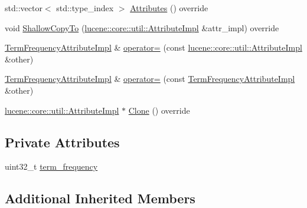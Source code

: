\begin{DoxyCompactItemize}
\item 
std\+::vector$<$ std\+::type\+\_\+index $>$ \mbox{\hyperlink{classlucene_1_1core_1_1analysis_1_1tokenattributes_1_1TermFrequencyAttributeImpl_a02e08b89bd1105326aff4d578c759886}{Attributes}} () override
\item 
void \mbox{\hyperlink{classlucene_1_1core_1_1analysis_1_1tokenattributes_1_1TermFrequencyAttributeImpl_a82c1cb2877fab77b907b4b03795d0fdf}{Shallow\+Copy\+To}} (\mbox{\hyperlink{classlucene_1_1core_1_1util_1_1AttributeImpl}{lucene\+::core\+::util\+::\+Attribute\+Impl}} \&attr\+\_\+impl) override
\item 
\mbox{\hyperlink{classlucene_1_1core_1_1analysis_1_1tokenattributes_1_1TermFrequencyAttributeImpl}{Term\+Frequency\+Attribute\+Impl}} \& \mbox{\hyperlink{classlucene_1_1core_1_1analysis_1_1tokenattributes_1_1TermFrequencyAttributeImpl_a855437532aa60208023e367fe09926fd}{operator=}} (const \mbox{\hyperlink{classlucene_1_1core_1_1util_1_1AttributeImpl}{lucene\+::core\+::util\+::\+Attribute\+Impl}} \&other)
\item 
\mbox{\hyperlink{classlucene_1_1core_1_1analysis_1_1tokenattributes_1_1TermFrequencyAttributeImpl}{Term\+Frequency\+Attribute\+Impl}} \& \mbox{\hyperlink{classlucene_1_1core_1_1analysis_1_1tokenattributes_1_1TermFrequencyAttributeImpl_afb31133bdba35cd3e19bbe1aefed9908}{operator=}} (const \mbox{\hyperlink{classlucene_1_1core_1_1analysis_1_1tokenattributes_1_1TermFrequencyAttributeImpl}{Term\+Frequency\+Attribute\+Impl}} \&other)
\item 
\mbox{\hyperlink{classlucene_1_1core_1_1util_1_1AttributeImpl}{lucene\+::core\+::util\+::\+Attribute\+Impl}} $\ast$ \mbox{\hyperlink{classlucene_1_1core_1_1analysis_1_1tokenattributes_1_1TermFrequencyAttributeImpl_a3d973d479d147e3feece05c9988bc7c6}{Clone}} () override
\end{DoxyCompactItemize}
\subsection*{Private Attributes}
\begin{DoxyCompactItemize}
\item 
uint32\+\_\+t \mbox{\hyperlink{classlucene_1_1core_1_1analysis_1_1tokenattributes_1_1TermFrequencyAttributeImpl_a94d743632e8edd5e9e05ce039eec16e8}{term\+\_\+frequency}}
\end{DoxyCompactItemize}
\subsection*{Additional Inherited Members}


